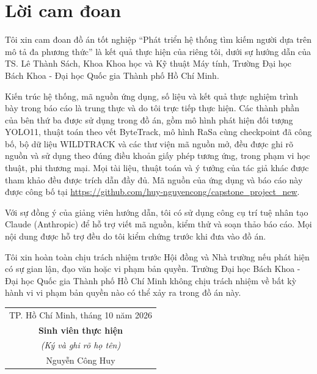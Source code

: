 \chapter*{Lời cam đoan}

Tôi xin cam đoan đồ án tốt nghiệp ``Phát triển hệ thống tìm kiếm người dựa trên mô tả đa phương thức'' là kết quả thực hiện của riêng tôi, dưới sự hướng dẫn của TS. Lê Thành Sách, Khoa Khoa học và Kỹ thuật Máy tính, Trường Đại học Bách Khoa - Đại học Quốc gia Thành phố Hồ Chí Minh.

Kiến trúc hệ thống, mã nguồn ứng dụng, số liệu và kết quả thực nghiệm trình bày trong báo cáo là trung thực và do tôi trực tiếp thực hiện. Các thành phần của bên thứ ba được sử dụng trong đồ án, gồm mô hình phát hiện đối tượng YOLO11, thuật toán theo vết ByteTrack, mô hình RaSa cùng checkpoint đã công bố, bộ dữ liệu WILDTRACK và các thư viện mã nguồn mở, đều được ghi rõ nguồn và sử dụng theo đúng điều khoản giấy phép tương ứng, trong phạm vi học thuật, phi thương mại. Mọi tài liệu, thuật toán và ý tưởng của tác giả khác được tham khảo đều được trích dẫn đầy đủ. Mã nguồn của ứng dụng và báo cáo này được công bố tại \url{https://github.com/huy-nguyencong/capstone_project_new}.

Với sự đồng ý của giảng viên hướng dẫn, tôi có sử dụng công cụ trí tuệ nhân tạo Claude (Anthropic) để hỗ trợ viết mã nguồn, kiểm thử và soạn thảo báo cáo. Mọi nội dung được hỗ trợ đều do tôi kiểm chứng trước khi đưa vào đồ án.

Tôi xin hoàn toàn chịu trách nhiệm trước Hội đồng và Nhà trường nếu phát hiện có sự gian lận, đạo văn hoặc vi phạm bản quyền. Trường Đại học Bách Khoa - Đại học Quốc gia Thành phố Hồ Chí Minh không chịu trách nhiệm về bất kỳ hành vi vi phạm bản quyền nào có thể xảy ra trong đồ án này.

\begin{flushright}
\begin{tabular}{c}
    TP. Hồ Chí Minh, tháng 10 năm 2026 \\
    \textbf{Sinh viên thực hiện} \\
    \textit{(Ký và ghi rõ họ tên)} \\[1.8cm]
    Nguyễn Công Huy
\end{tabular}
\end{flushright}
